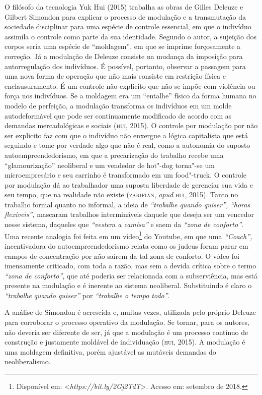O filósofo da tecnologia Yuk Hui (2015) trabalha as obras de Gilles
Deleuze e Gilbert Simondon para explicar o processo de modulação e a
transmutação da sociedade disciplinar para uma espécie de controle
essencial, em que o indivíduo assimila o controle como parte da sua
identidade. Segundo o autor, a sujeição dos corpos seria uma espécie de
``moldagem'', em que se imprime forçosamente a correção. Já a modulação
de Deleuze consiste na mudança da imposição para autorregulação dos
indivíduos. É possível, portanto, observar a passagem para uma nova
forma de operação que não mais consiste em restrição física e
enclausuramento. É um controle não explícito que não se impõe com
violência ou força nos indivíduos. Se a moldagem era um ``entalhe''
físico da forma humana no modelo de perfeição, a modulação transforma os
indivíduos em um molde autodeformável que pode ser continuamente
modificado de acordo com as demandas mercadológicas e sociais (\textsc{hui},
2015). O controle por modulação por não ser explicito faz com que o
indivíduo não enxergue a lógica capitalista que está seguindo e tome por
verdade algo que não é real, como a autonomia do suposto
autoempreendedorismo, em que a precarização do trabalho recebe uma
``glamourização'' neoliberal e um vendedor de hot"-dog torna"-se um
microempresário e seu carrinho é transformado em um food"-truck. O
controle por modulação dá ao trabalhador uma suposta liberdade de
gerenciar sua vida e seu tempo, que na realidade não existe (\textsc{zarifian}, \emph{apud} \textsc{hui}, 2015). Tanto no trabalho formal quanto no
informal, a ideia de \emph{``trabalhe quando quiser'',} \emph{``horas
flexíveis'',} mascaram trabalhos intermináveis daquele que deseja ser um
vencedor nesse sistema, daqueles que \emph{``vestem a camisa''} e saem
da \emph{``zona de conforto''}. Uma recente analogia foi feita em um
vídeo\footnote{Disponível em: \textless{}\emph{https://bit.ly/2Gj2TdT}\textgreater{}.
  Acesso em: setembro de 2018.} do Youtube, em que uma \emph{``Coach'',}
incentivadora do autoempreendedorismo relata como os judeus foram parar
em campos de concentração por não saírem da tal zona de conforto. O
vídeo foi imensamente criticado, com toda a razão, mas sem a devida
crítica sobre o termo \emph{``zona de conforto''}, que até poderia ser
relacionada com a subserviência, mas está presente na modulação e é
inerente ao sistema neoliberal. Substituindo é claro o \emph{``trabalhe}
\emph{quando quiser''} por \emph{``trabalhe o tempo todo''}.

A análise de Simondon é acrescida e, muitas vezes, utilizada pelo
próprio Deleuze para corroborar o processo operativo da modulação. Se
tornar, para os autores, não deveria ser diferente de ser, já que a
modulação é um processo contínuo de construção e justamente moldável de
individuação (\textsc{hui}, 2015). A modulação é uma moldagem definitiva,
porém ajustável as mutáveis demandas do neoliberalismo.

